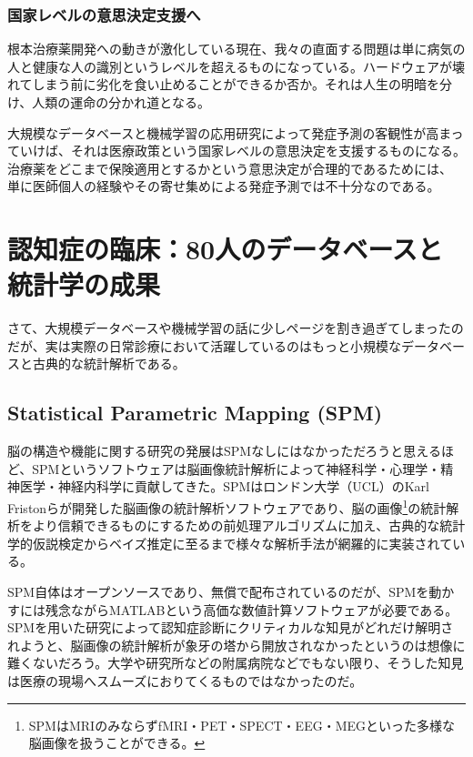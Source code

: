\subsubsection{国家レベルの意思決定支援へ}
根本治療薬開発への動きが激化している現在、我々の直面する問題は単に病気の人と健康な人の識別というレベルを超えるものになっている。ハードウェアが壊れてしまう前に劣化を食い止めることができるか否か。それは人生の明暗を分け、人類の運命の分かれ道となる。

大規模なデータベースと機械学習の応用研究によって発症予測の客観性が高まっていけば、それは医療政策という国家レベルの意思決定を支援するものになる。
治療薬をどこまで保険適用とするかという意思決定が合理的であるためには、
単に医師個人の経験やその寄せ集めによる発症予測では不十分なのである。


\section{認知症の臨床：80人のデータベースと統計学の成果}
さて、大規模データベースや機械学習の話に少しページを割き過ぎてしまったのだが、実は実際の日常診療において活躍しているのはもっと小規模なデータベースと古典的な統計解析である。

\subsection{Statistical Parametric Mapping (SPM)}
脳の構造や機能に関する研究の発展はSPMなしにはなかっただろうと思えるほど、SPMというソフトウェアは脳画像統計解析によって神経科学・心理学・精神医学・神経内科学に貢献してきた。SPMはロンドン大学（UCL）のKarl Fristonらが開発した脳画像の統計解析ソフトウェアであり、脳の画像\footnote{SPMはMRIのみならずfMRI・PET・SPECT・EEG・MEGといった多様な脳画像を扱うことができる。}の統計解析をより信頼できるものにするための前処理アルゴリズムに加え、古典的な統計学的仮説検定からベイズ推定に至るまで様々な解析手法が網羅的に実装されている。

SPM自体はオープンソースであり、無償で配布されているのだが、SPMを動かすには残念ながらMATLABという高価な数値計算ソフトウェアが必要である。SPMを用いた研究によって認知症診断にクリティカルな知見がどれだけ解明されようと、脳画像の統計解析が象牙の塔から開放されなかったというのは想像に難くないだろう。大学や研究所などの附属病院などでもない限り、そうした知見は医療の現場へスムーズにおりてくるものではなかったのだ。
